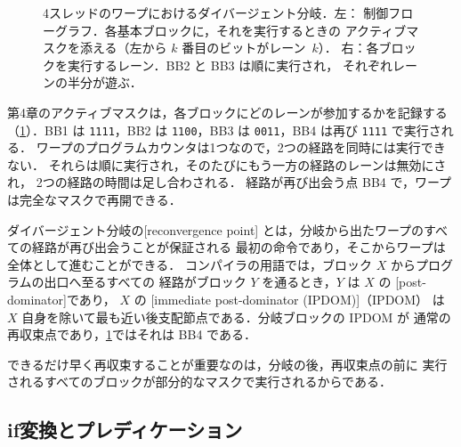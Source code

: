 \documentclass[../main.tex]{subfiles}
\begin{document}
\begin{figure}[tb]
  \centering
  
  \caption{4スレッドのワープにおけるダイバージェント分岐．左：
    制御フローグラフ．各基本ブロックに，それを実行するときの
    アクティブマスクを添える（左から $k$ 番目のビットがレーン~$k$）．
    右：各ブロックを実行するレーン．BB2 と BB3 は順に実行され，
    それぞれレーンの半分が遊ぶ．}
  \label{fig:l06-divergent-cfg}
\end{figure}

第4章のアクティブマスクは，各ブロックにどのレーンが参加するかを記録する
（\cref{fig:l06-divergent-cfg}）．BB1 は \texttt{1111}，BB2 は
\texttt{1100}，BB3 は \texttt{0011}，BB4 は再び \texttt{1111} で実行される．
ワープのプログラムカウンタは1つなので，2つの経路を同時には実行できない．
それらは順に実行され，そのたびにもう一方の経路のレーンは無効にされ，
2つの経路の時間は足し合わされる．
経路が再び出会う点 BB4 で，ワープは完全なマスクで再開できる．

\begin{definition}[再収束点]
  \label{def:l06-reconvergence}
  ダイバージェント分岐の[reconvergence point]
  とは，分岐から出たワープのすべての経路が再び出会うことが保証される
  最初の命令であり，そこからワープは全体として進むことができる．
  コンパイラの用語では，ブロック $X$ からプログラムの出口へ至るすべての
  経路がブロック $Y$ を通るとき，$Y$ は $X$ の
  [post-dominator]であり，
  $X$ の
  [immediate post-dominator (IPDOM)]（IPDOM）
  は $X$ 自身を除いて最も近い後支配節点である．分岐ブロックの IPDOM が
  通常の再収束点であり，\cref{fig:l06-divergent-cfg}ではそれは BB4 である．
\end{definition}

%
できるだけ早く再収束することが重要なのは，分岐の後，再収束点の前に
実行されるすべてのブロックが部分的なマスクで実行されるからである．

\subsection{if変換とプレディケーション}
\end{document}
